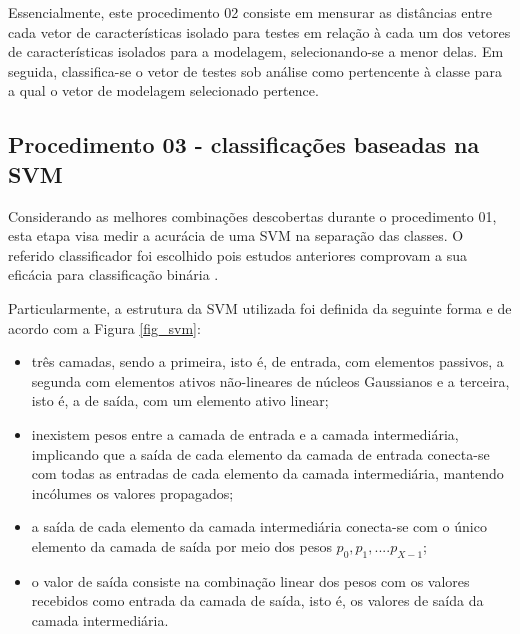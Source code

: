 		\par Essencialmente, este procedimento 02 consiste em mensurar as distâncias entre cada vetor de características isolado para testes em relação à cada um dos vetores de características isolados para a modelagem, selecionando-se a menor delas. Em seguida, classifica-se o vetor de testes sob análise como pertencente à classe para a qual o vetor de modelagem selecionado pertence.   
								
		

		\subsection{Procedimento 03 - classificações baseadas na SVM}
		\label{chap:propApproach:sec:Experimento03}
		\par Considerando as melhores combinações descobertas durante o procedimento 01, esta etapa visa medir a acurácia de uma SVM na separação das classes. O referido classificador foi escolhido pois estudos anteriores comprovam a sua eficácia para classificação binária \cite{bennett2000support}. 
		
		\par Particularmente, a estrutura da SVM utilizada foi definida da seguinte forma e de acordo com a Figura \ref{fig_svm}: 
		\begin{itemize}
		\item{}três camadas, sendo a primeira, isto é, de entrada, com elementos passivos, a segunda com elementos ativos não-lineares de núcleos Gaussianos e a terceira, isto é, a de saída, com um elemento ativo linear; 
		\item{}inexistem pesos entre a camada de entrada e a camada intermediária, implicando que a saída de cada elemento da camada de entrada conecta-se com todas as entradas de cada elemento da camada intermediária, mantendo incólumes os valores propagados;
		\item{}a saída de cada elemento da camada intermediária conecta-se com o único elemento da camada de saída por meio dos pesos $p_0, p_1, .... p_{X-1}$;
		\item{}o valor de saída consiste na combinação linear dos pesos com os valores recebidos como entrada da camada de saída, isto é, os valores de saída da camada intermediária.
		\end{itemize}
		
